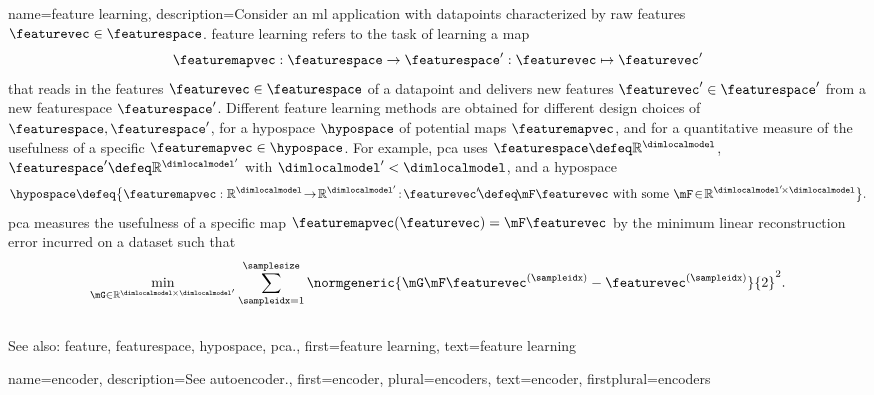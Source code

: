 {name={feature learning},
	description={Consider an \gls{ml} application with \glspl{datapoint} characterized by 
		raw \glspl{feature} $\featurevec \in \featurespace$. \Gls{feature} learning 
		refers to the task of learning a \gls{map} 
		$$\featuremapvec: \featurespace \rightarrow \featurespace': \featurevec \mapsto \featurevec'$$ 
		that reads in the \glspl{feature} $\featurevec \in \featurespace$ of a \gls{datapoint} and delivers new 
		\glspl{feature} $\featurevec' \in \featurespace'$ from a new \gls{featurespace} $\featurespace'$. 
		Different \gls{feature} learning methods are obtained for different design 
		choices of $\featurespace,\featurespace'$, for a \gls{hypospace} $\hypospace$ 
		of potential \glspl{map} $\featuremapvec$, and for a quantitative \gls{measure} of the usefulness of 
		a specific $\featuremapvec \in \hypospace$. For example, \gls{pca} 
		uses $\featurespace \defeq \mathbb{R}^{\dimlocalmodel}$, $\featurespace' \defeq \mathbb{R}^{\dimlocalmodel'}$ 
		with $\dimlocalmodel' < \dimlocalmodel$, and a \gls{hypospace} 
		$$\hypospace\defeq \big\{ \featuremapvec: \mathbb{R}^{\dimlocalmodel}
		\!\rightarrow\! \mathbb{R}^{\dimlocalmodel'}\!:\!\featurevec'\!\defeq\!\mF \featurevec \mbox{ with some } \mF \!\in\! \mathbb{R}^{\dimlocalmodel' \!\times \dimlocalmodel} \big\}.$$ 
		\Gls{pca} measures the usefulness of a specific \gls{map} $\featuremapvec(\featurevec)= \mF \featurevec$ 
		by the \gls{minimum} linear reconstruction error incurred on a \gls{dataset} such that 
		$$\min_{\mG \in \mathbb{R}^{\dimlocalmodel \!\!\!\times \dimlocalmodel'}} \sum_{\sampleidx=1}^{\samplesize} \normgeneric{\mG \mF \featurevec^{(\sampleidx)} - \featurevec^{(\sampleidx)}}{2}^{2}.$$ 
			\\ 
		See also: \gls{feature}, \gls{featurespace}, \gls{hypospace}, \gls{pca}.}, 
	first={feature learning},
	text={feature learning}
}

{name={encoder}, 
	description={See \gls{autoencoder}.}, 
 	first={encoder}, 
 	plural={encoders}, 
 	text={encoder}, 
 	firstplural={encoders}
}

